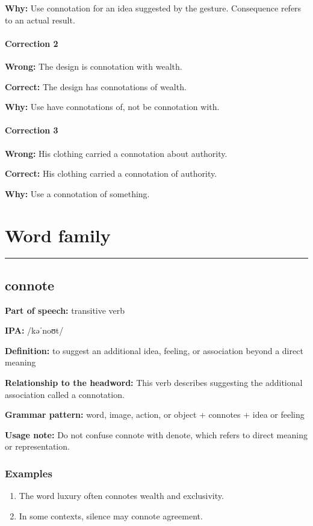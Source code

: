 \documentclass[11pt]{article}
\newcommand{\sectionrule}{\par\vspace{-0.5em}\noindent\textcolor{Accent}{\rule{\linewidth}{0.6pt}}\par}
\begin{document}
\textbf{Why:} Use connotation for an idea suggested by the gesture. Consequence refers to an actual result.

\paragraph{Correction 2}
\textbf{Wrong:} The design is connotation with wealth.

\textbf{Correct:} The design has connotations of wealth.

\textbf{Why:} Use have connotations of, not be connotation with.

\paragraph{Correction 3}
\textbf{Wrong:} His clothing carried a connotation about authority.

\textbf{Correct:} His clothing carried a connotation of authority.

\textbf{Why:} Use a connotation of something.

\section{Word family}
\sectionrule
\subsection{connote}
\textbf{Part of speech:} transitive verb

\textbf{IPA:} /kəˈnoʊt/

\textbf{Definition:} to suggest an additional idea, feeling, or association beyond a direct meaning

\textbf{Relationship to the headword:} This verb describes suggesting the additional association called a connotation.

\textbf{Grammar pattern:} word, image, action, or object + connotes + idea or feeling

\textbf{Usage note:} Do not confuse connote with denote, which refers to direct meaning or representation.

\subsubsection{Examples}
\begin{enumerate}
  \item The word luxury often connotes wealth and exclusivity.
  \item In some contexts, silence may connote agreement.
\end{enumerate}
\end{document}
